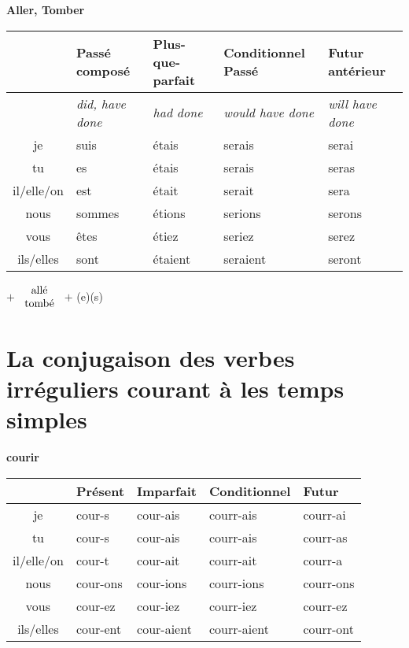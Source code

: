 \begin{flushleft}
\textbf{Aller, Tomber}
\vskip 0.1cm
\begin{tabular}{|c||L{2.5cm}|L{2.5cm}|L{2.5cm}|L{2.5cm}|}
\hline
& Pass\'e compos\'e & Plus-que-parfait & Conditionnel Pass\'e & Futur ant\'erieur \\
\hline
& \textit{did, have done} & \textit{had done} & \textit{would have done} & \textit{will have done} \\
\hline\hline
je            &	suis	&	\'etais	&	serais	 &	serai	\\
tu            &	es 	&	\'etais	&	serais	&	seras	\\
il/elle/on  &	est	&	\'etait	&	serait	&	sera	\\
nous       &	sommes	&	\'etions	&	serions	&	serons	\\
vous       &	\^etes	&	\'etiez	&	seriez		&	serez	\\
ils/elles   &	sont 	&	\'etaient	&	seraient	&	seront	\\
\hline
\end{tabular}
\;$+$
$\begin{array}{c}
\textnormal{all\'e}
\\
\textnormal{tomb\'e}
\end{array}$
$+$ (e)(s)
\end{flushleft}


\clearpage
\section{La conjugaison des verbes irr\'eguliers courant \`a les temps simples}
\setcounter{theorem}{0}
\setcounter{equation}{0}

\renewcommand{\stemPresent}{cour}
\renewcommand{\stemFutur}{courr}
\begin{center}
\textbf{courir}
\vskip 0.1cm
\begin{tabular}{|c||L{3cm}|L{3cm}|L{3cm}|L{3cm}|}
\hline
& Pr\'esent & Imparfait & Conditionnel & Futur \\
\hline\hline
je           &	\stemPresent-s 	&	\stemPresent-ais	&	\stemFutur-ais	 &	\stemFutur-ai	\\
tu           &	\stemPresent-s	&	\stemPresent-ais	&	\stemFutur-ais	&	\stemFutur-as	\\
il/elle/on &	\stemPresent-t	&	\stemPresent-ait	&	\stemFutur-ait	&	\stemFutur-a	\\
nous      &	\stemPresent-ons	&	\stemPresent-ions	&	\stemFutur-ions	&	\stemFutur-ons	\\
vous      &	\stemPresent-ez	&	\stemPresent-iez	&	\stemFutur-iez		&	\stemFutur-ez	\\
ils/elles  &	\stemPresent-ent	&	\stemPresent-aient	&	\stemFutur-aient	&	\stemFutur-ont	\\
\hline
\end{tabular}
\end{center}







